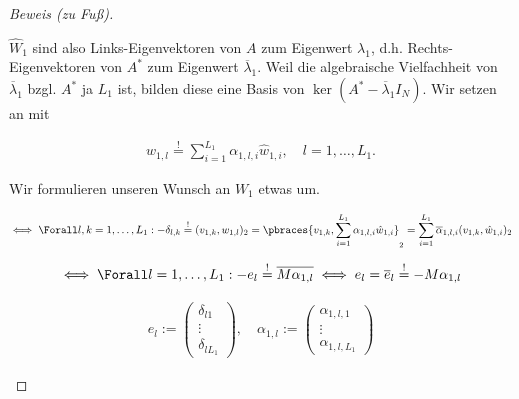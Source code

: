\begin{proof}[Beweis (zu Fuß)]
\begin{enumerate}[label = (\roman*)]
        $\hat W_1$ sind also Links-Eigenvektoren von $A$ zum Eigenwert $\lambda_1$, d.h. Rechts-Eigenvektoren von $A^\ast$ zum Eigenwert $\overline \lambda_1$.
        Weil die algebraische Vielfachheit von $\overline \lambda_1$ bzgl. $A^\ast$ ja $L_1$ ist, bilden diese eine Basis von $\ker (A^\ast - \overline \lambda_1 I_N)$.
        Wir setzen an mit

        \begin{align*}
            w_{1, l}
            \stackrel{!}{=}
            \sum_{i=1}^{L_1}
                \alpha_{1, l, i} \hat w_{1, i},
            \quad
            l = 1, \dots, L_1.
        \end{align*}

        Wir formulieren unseren Wunsch an $W_1$ etwas um.

        \begin{align*}
            \iff
            \Forall l, k = 1, \dots, L_1:
                -\delta_{l, k}
                \stackrel{!}{=}
                (v_{1, k}, w_{1, l})_2
                =
                \pbraces
                {
                    v_{1, k},
                    \sum_{i=1}^{L_1}
                        \alpha_{1, l, i} \hat w_{1, i}
                }_2
                =
                \sum_{i=1}^{L_1}
                    \overline \alpha_{1, l, i} (v_{1, k}, \hat w_{1, i})_2
        \end{align*}

        \begin{align*}
            \iff
            \Forall l = 1, \dots, L_1:
                -e_l
                \stackrel{!}{=}
                \overline{M \alpha_{1, l}}
            \iff
                e_l
                =
                \overline e_l
                \stackrel{!}{=}
                -M \alpha_{1, l}
        \end{align*}

        \begin{align*}
            e_l
            :=
            \begin{pmatrix}
                \delta_{l 1} \\ \vdots \\ \delta_{l L_1}
            \end{pmatrix},
            \quad
            \alpha_{1, l}
            :=
            \begin{pmatrix}
                \alpha_{1, l, 1} \\ \vdots \\ \alpha_{1, l, L_1}
            \end{pmatrix}
        \end{align*}


\end{enumerate}
\end{proof}
